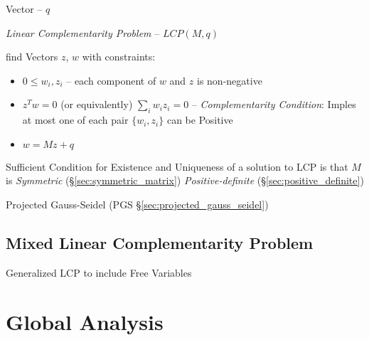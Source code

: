 Vector -- $q$

\emph{Linear Complementarity Problem} -- $LCP(M,q)$

find Vectors $z$, $w$ with constraints:

\begin{itemize}
  \item $0 \leq w_i,z_i$ -- each component of $w$ and $z$ is
    non-negative
  \item $z^T w = 0$ (or equivalently) $\sum_i w_i z_i = 0$ --
    \emph{Complementarity Condition}: Imples at most one of each pair
    $\{w_i,z_i\}$ can be Positive
  \item $w = M z + q$
\end{itemize}

Sufficient Condition for Existence and Uniqueness of a solution to LCP
is that $M$ is \emph{Symmetric} (\S\ref{sec:symmetric_matrix})
\emph{Positive-definite} (\S\ref{sec:positive_definite})

\fist Projected Gauss-Seidel (PGS \S\ref{sec:projected_gauss_seidel})


\subsection{Mixed Linear Complementarity Problem}\label{sec:mlcp}

Generalized LCP to include Free Variables



\section{Global Analysis}\label{sec:global_analysis}
